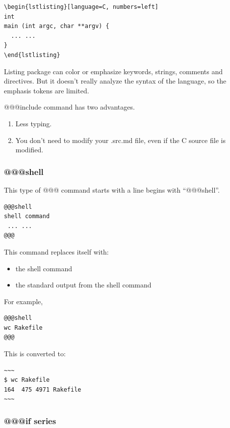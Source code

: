 \begin{verbatim}
\begin{lstlisting}[language=C, numbers=left]
int
main (int argc, char **argv) {
  ... ...
}
\end{lstlisting}
\end{verbatim}

Listing package can color or emphasize keywords, strings, comments and
directives. But it doesn't really analyze the syntax of the language, so
the emphasis tokens are limited.

@@@include command has two advantages.

\begin{enumerate}
\def\labelenumi{\arabic{enumi}.}
\tightlist
\item
  Less typing.
\item
  You don't need to modify your .src.md file, even if the C source file
  is modified.
\end{enumerate}

\subsubsection{@@@shell}\label{shell}

This type of @@@ command starts with a line begins with ``@@@shell''.

\begin{verbatim}
@@@shell
shell command
 ... ...
@@@
\end{verbatim}

This command replaces itself with:

\begin{itemize}
\tightlist
\item
  the shell command
\item
  the standard output from the shell command
\end{itemize}

For example,

\begin{verbatim}
@@@shell
wc Rakefile
@@@
\end{verbatim}

This is converted to:

\begin{verbatim}
~~~
$ wc Rakefile
164  475 4971 Rakefile
~~~
\end{verbatim}

\subsubsection{@@@if series}\label{if-series}

